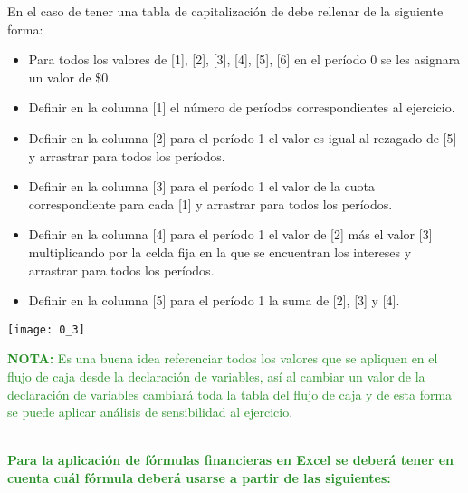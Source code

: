 \begin{enumerate}
    En el caso de tener una tabla de capitalización de debe rellenar de la siguiente forma:
    \begin{itemize}
        \color{ForestGreen}
        \item Para todos los valores de [1], [2], [3], [4], [5], [6] en el período 0 se les asignara un valor de \$0.
        \item Definir en la columna [1] el número de períodos correspondientes al ejercicio.
        \item Definir en la columna [2] para el período 1 el valor es igual al rezagado de [5] y arrastrar para todos los períodos.
        \item Definir en la columna [3] para el período 1 el valor de la cuota correspondiente para cada [1] y arrastrar para todos los períodos.
        \item Definir en la columna [4] para el período 1 el valor de [2] más el valor [3] multiplicando por la celda fija en la que se encuentran los intereses y arrastrar para todos los períodos.
        \item Definir en la columna [5] para el período 1 la suma de [2], [3] y [4].
    \end{itemize} 
    \begin{center}
    \texttt{[image: 0\_3]}
    \end{center}
    \textcolor{ForestGreen}{\textbf{NOTA:} Es una buena idea referenciar todos los valores que se apliquen en el flujo de caja desde la declaración de variables, así al cambiar un valor de la declaración de variables cambiará toda la tabla del flujo de caja y de esta forma se puede aplicar análisis de sensibilidad al ejercicio.} \\ \\ 
    
    \textcolor{ForestGreen}{\item \textbf{Para la aplicación de fórmulas financieras en Excel se deberá tener en cuenta cuál fórmula deberá usarse a partir de las siguientes:}} \\
    


\end{enumerate}

